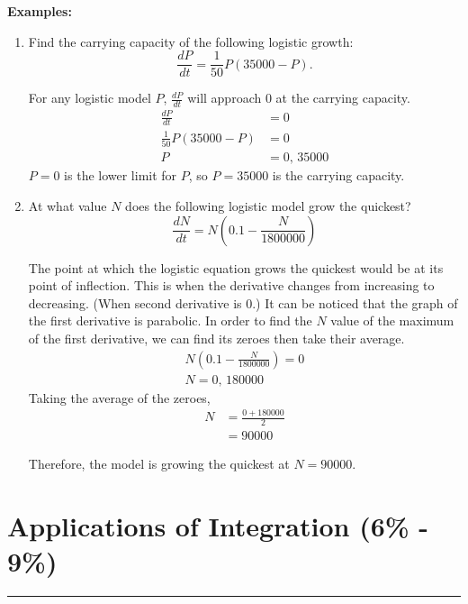 \documentclass[12pt]{article}
\newcommand{\fline}{\par\noindent\rule{\textwidth}{0.1pt}} %
\begin{document}
            \noindent \textbf{Examples:}
            \begin{enumerate}
                \item Find the carrying capacity of the following logistic growth:
                \[ \frac{dP}{dt} = \frac{1}{50} P (35000 - P). \]

                For any logistic model $P$, $\frac{dP}{dt}$ will approach $0$ at the carrying capacity.
                \begin{align*}
                    \frac{dP}{dt} &= 0 \\[6pt]
                    \frac{1}{50} P (35000 - P) &= 0 \\[6pt]
                    P &= 0, \, 35000
                \end{align*}
                $P=0$ is the lower limit for $P$, so $P=35000$ is the carrying capacity.
                \bigskip

                \item At what value $N$ does the following logistic model grow the quickest?
                \[ \frac{dN}{dt} = N \left( 0.1 - \frac{N}{1800000} \right) \]

                The point at which the logistic equation grows the quickest would be at its point of inflection. This is when the derivative changes from increasing to decreasing. (When second derivative is $0$.) It can be noticed that the graph of the first derivative is parabolic. In order to find the $N$ value of the maximum of the first derivative, we can find its zeroes then take their average.
                \begin{gather*}
                    N \left( 0.1 - \frac{N}{1800000} \right) = 0 \\[6pt]
                    N = 0, \, 180000
                \end{gather*}
                Taking the average of the zeroes,
                \begin{align*}
                    N &= \frac{0 + 180000}{2} \\[6pt]
                    &= 90000
                \end{align*}

                Therefore, the model is growing the quickest at $N=90000$.
            \end{enumerate}

    \section{Applications of Integration (6\% - 9\%)}
    \fline
\end{document}
